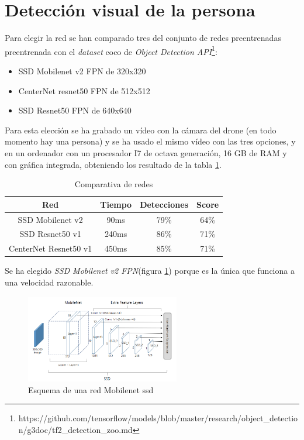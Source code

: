 \section{Detección visual de la persona}
Para elegir la red se han comparado tres del conjunto de redes preentrenadas preentrenada con el \textit{dataset} \acrshort{coco} de \textit{Object Detection API}\footnote{https://github.com/tensorflow/models/blob/master/research/object_detection/g3doc/tf2_detection_zoo.md}:
\begin{itemize}
  \item SSD Mobilenet v2 FPN de 320x320
  \item CenterNet resnet50 FPN de 512x512
  \item SSD Resnet50 FPN de 640x640
\end{itemize}
Para esta elección se ha grabado un vídeo con la cámara del drone (en todo momento hay una persona) y se ha usado el mismo vídeo con las tres opciones, y en un ordenador con un procesador I7 de octava generación, 16 GB de RAM y con gráfica integrada, obteniendo los resultado de la tabla \ref{tab:comparativa_redes}.
\begin{table}[H]
\centering
\begin{tabular}{|c|c|c|c|}
\hline
\textbf{Red}          & \textbf{Tiempo} & \textbf{Detecciones} & \textbf{Score} \\ \hline 
SSD Mobilenet v2      & 90ms            & 79\%        & 64\%           \\ \hline  
SSD Resnet50 v1       & 240ms           & 86\%        & 71\%           \\\hline  
CenterNet Resnet50 v1 & 450ms           & 85\%        & 71\%           \\ \hline 
\end{tabular}
\caption{Comparativa de redes}
\label{tab:comparativa_redes}
\end{table}
Se ha elegido \textit{SSD Mobilenet v2 FPN}(figura \ref{fig:mobilenet}) porque es la única que funciona a una velocidad razonable.
\begin{figure}[H]
  \begin{center}
    \includegraphics[width=0.6\textwidth]{figures/real/mobilenet.png}
		\caption{Esquema de una red Mobilenet ssd}
		\label{fig:mobilenet}
		\end{center}
\end{figure}
